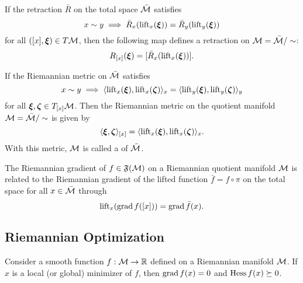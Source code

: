 \documentclass[11pt,a4paper]{article}
\begin{document}
\begin{proposition}
If the retraction $\bar{R}$ on the total space $\bar{\mathcal{M}}$ satisfies
\begin{equation*}
x\sim y\implies \bar{R}_x(\text{lift}_x(\boldsymbol\xi)) = \bar{R}_y(\text{lift}_y(\boldsymbol\xi))
\end{equation*}
for all $([x],\boldsymbol\xi)\in T\mathcal{M}$, then the following map defines a retraction on $\mathcal{M} = \bar{\mathcal{M}}/\sim$:
\begin{equation*}
R_{[x]}(\boldsymbol\xi) = [\bar{R}_x(\text{lift}_x(\boldsymbol\xi))].
\end{equation*}
\end{proposition}

\begin{proposition}
If the Riemannian metric on $\bar{\mathcal{M}}$ satisfies
\begin{equation*}
x\sim y\implies \langle \text{lift}_x(\boldsymbol\xi), \text{lift}_x(\boldsymbol\zeta) \rangle_x = \langle \text{lift}_y(\boldsymbol\xi), \text{lift}_y(\boldsymbol\zeta) \rangle_y
\end{equation*}
for all $\boldsymbol\xi,\boldsymbol\zeta\in T_{[x]}\mathcal{M}$. Then the Riemannian metric on the quotient manifold $\mathcal{M} = \bar{\mathcal{M}}/\sim$ is given by 
\begin{equation*}
\langle \boldsymbol\xi, \boldsymbol\zeta \rangle_{[x]} = \langle \text{lift}_x(\boldsymbol\xi), \text{lift}_x(\boldsymbol\zeta) \rangle_x.
\end{equation*}
With this metric, $\mathcal{M}$ is called a  of $\bar{\mathcal{M}}$.
\end{proposition}

\begin{proposition}
The Riemannian gradient of $f\in\mathfrak{F}(\mathcal{M})$ on a Riemannian quotient manifold $\mathcal{M}$ is related to the Riemannian gradient of the lifted function $\bar{f} = f\circ \pi$ on the total space for all $x\in \bar{\mathcal{M}}$ through
\begin{equation*}
\text{lift}_x(\text{grad}\, f([x])) = \text{grad}\, \bar{f}(x).
\end{equation*}
\end{proposition}

\subsection{Riemannian Optimization}

\begin{proposition}
Consider a smooth function $f:\mathcal{M}\rightarrow \mathbb{R}$ defined on a Riemannian manifold $\mathcal{M}$. If $x$ is a local (or global) minimizer of $f$, then $\text{grad}\, f(x) = 0$ and $\text{Hess}\, f(x) \succeq 0$.
\end{proposition}
\end{document}
